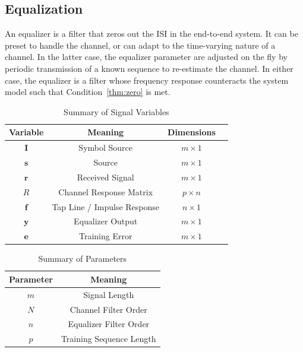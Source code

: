 \documentclass[]{article}
\begin{document}
\subsection{Equalization}
\label{app:equal}
An equalizer is a filter that zeros out the ISI in the end-to-end system.  It can be preset to handle the channel, or can adapt to the time-varying nature of a channel.  In the latter case, the equalizer parameter are adjusted on the fly by periodic transmission of a known sequence to re-estimate the channel.  In either case, the equalizer is a filter whose frequency response counteracts the system model such that Condition~\ref{thm:zero} is met. 

\begin{table}[H]
\begin{center}
\begin{tabular}{|c|c|c|c|}
\hline Variable & Meaning & Dimensions \\
\hline \hline
$\mathbf{I}$ & Symbol Source & $ m \times 1$ \\ \hline
$\mathbf{s}$ & Source & $m\times 1 $\\ \hline
$\mathbf{r}$ & Received Signal & $m\times 1$ \\ \hline
$R$ & Channel Response Matrix & $p\times n$ \\ \hline
$\mathbf{f}$ & Tap Line / Impulse Response & $n\times 1 $ \\ \hline
$\mathbf{y}$ & Equalizer Output & $ m\times 1 $ \\ \hline
 $\mathbf{e}$ & Training Error & $ m\times 1 $ \\ \hline
\end{tabular}
\caption{Summary of Signal Variables} \label{tab:filtersummary}
\end{center}
\end{table}

\begin{table}[b]
\begin{center}
\begin{tabular}{|c|c|}
\hline Parameter & Meaning \\
\hline \hline
$m$ & Signal Length \\ \hline
$N$ & Channel Filter Order \\ \hline
$n$ & Equalizer Filter Order \\ \hline
$p$ & Training Sequence Length \\ \hline
\end{tabular}
\caption{Summary of Parameters} \label{tab:Paramsummary}
\end{center}
\end{table}
\end{document}
